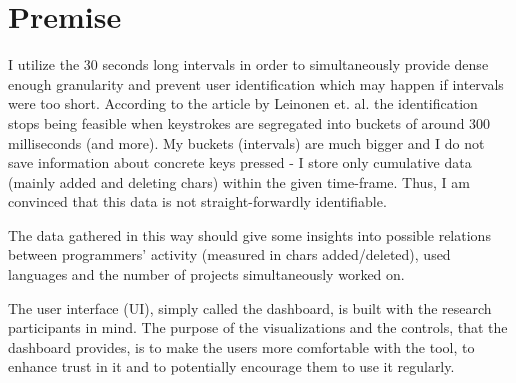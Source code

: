 \section{Premise}

I utilize the 30 seconds long intervals in order to simultaneously provide dense enough granularity and prevent user identification which may happen if intervals were too short. According to the article by Leinonen et. al. \cite{Lei17PreventIdentification} the identification stops being feasible when keystrokes are segregated into buckets of around 300 milliseconds (and more). My buckets (intervals) are much bigger and I do not save information about concrete keys pressed - I store only cumulative data (mainly added and deleting chars) within the given time-frame. Thus, I am convinced that this data is not straight-forwardly identifiable.

The data gathered in this way should give some insights into possible relations between programmers' activity (measured in chars added/deleted), used languages and the number of projects simultaneously worked on.

The user interface (UI), simply called the dashboard, is built with the research participants in mind. The purpose of the visualizations and the controls, that the dashboard provides, is to make the users more comfortable with the tool, to enhance trust in it and to potentially encourage them to use it regularly.
